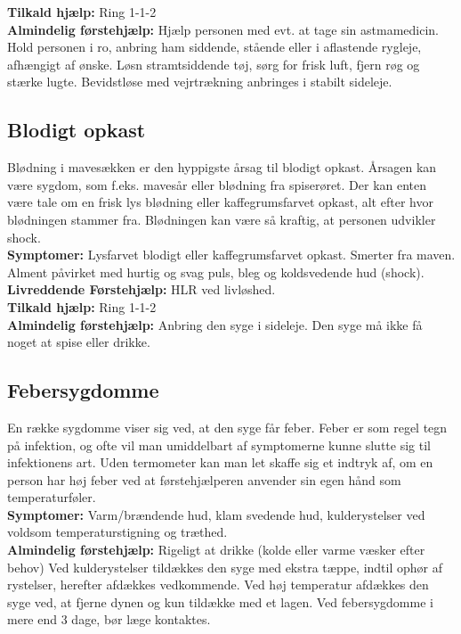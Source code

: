\documentclass[../../../main.tex]{subfiles}
\begin{document}
\begin{multicols}{2}
\textbf{Tilkald hjælp:} Ring 1-1-2
\\

\textbf{Almindelig førstehjælp:} Hjælp personen med evt. at tage sin astmamedicin. Hold personen i ro, anbring ham siddende, stående eller i aflastende rygleje, afhængigt af ønske. Løsn stramtsiddende tøj, sørg for frisk luft, fjern røg og stærke lugte. Bevidstløse med vejrtrækning anbringes i stabilt sideleje.
\\
\subsection*{Blodigt opkast}Blødning i mavesækken er den hyppigste årsag til blodigt opkast. Årsagen kan være sygdom, som f.eks. mavesår eller blødning fra spiserøret. Der kan enten være tale om en frisk lys blødning eller kaffegrumsfarvet opkast, alt efter hvor blødningen stammer fra. Blødningen kan være så kraftig, at personen udvikler shock.
\\

\textbf{Symptomer:} Lysfarvet blodigt eller kaffegrumsfarvet opkast. Smerter fra maven. Alment påvirket med hurtig og svag puls, bleg og koldsvedende hud (shock).
\\

\textbf{Livreddende Førstehjælp:} HLR ved livløshed.
\\

\textbf{Tilkald hjælp:} Ring 1-1-2
\\

\textbf{Almindelig førstehjælp:} Anbring den syge i sideleje. Den syge må ikke få noget at spise eller drikke.
\\

\subsection*{Febersygdomme} En række sygdomme viser sig ved, at den syge får
feber. Feber er som regel tegn på infektion, og ofte vil man umiddelbart af symptomerne kunne slutte sig til infektionens art. Uden termometer kan man let skaffe sig et indtryk af, om en person har høj feber ved at førstehjælperen anvender sin egen hånd som temperaturføler.
\\

\textbf{Symptomer:} Varm/brændende hud, klam svedende hud, kulderystelser ved voldsom temperaturstigning og træthed.
\\

\textbf{Almindelig førstehjælp:} Rigeligt at drikke (kolde eller varme væsker efter behov) Ved kulderystelser tildækkes den syge med ekstra tæppe, indtil ophør af rystelser, herefter afdækkes vedkommende. Ved høj temperatur afdækkes den syge ved, at fjerne dynen og kun tildække med et lagen. Ved febersygdomme i mere end 3 dage, bør læge kontaktes.
\\


\end{multicols}
\end{document}

